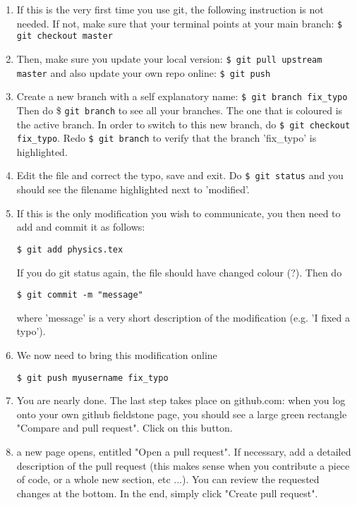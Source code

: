 \begin{enumerate}
\item
If this is the very first time you use git, the following instruction is not needed. If not, 
make sure that your terminal points at your main branch:
\verb"$ git checkout master"

\item
Then, make sure you update your local version:
\verb"$ git pull upstream master" 
and also update your own repo online:
\verb"$ git push"

\item
Create a new branch with a self explanatory name:
\verb"$ git branch fix_typo"
Then do \$ \verb"git branch" to see all your branches. The one that is coloured is 
the active branch. In order to switch to this new branch, do 
\verb"$ git checkout fix_typo". Redo \verb"$ git branch" to verify that 
the branch 'fix\_typo' is highlighted.


\item
Edit the file and correct the typo, save and exit. 
Do \verb"$ git status" and you should see the filename highlighted next to 'modified'. 

\item If this is the only modification you wish to communicate, you then need to add and commit 
it as follows:
\begin{verbatim}
$ git add physics.tex
\end{verbatim}
If you do git status again, the file should have changed colour (?). 
Then do
\begin{verbatim}
$ git commit -m "message"
\end{verbatim}
where 'message' is a very short description of the modification (e.g. 'I fixed a typo').

\item We now need to bring this modification online 
\begin{verbatim}
$ git push myusername fix_typo
\end{verbatim}

\item You are nearly done. The last step takes place on github.com: when you log onto 
your own github fieldstone page, you should see a large green rectangle "Compare and pull request".
Click on this button.

\item a new page opens, entitled "Open a pull request". If necessary, add a detailed description of 
the pull request (this makes sense when you contribute a piece of code, or a whole new section, etc ...).
You can review the requested changes at the bottom. In the end, simply click "Create pull request".


\end{enumerate}
